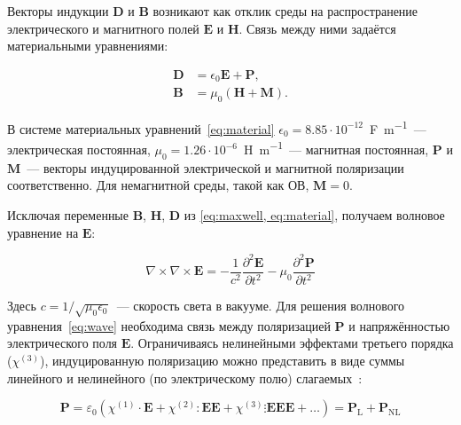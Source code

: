 Векторы индукции $\mathbf{D}$ и $\mathbf{B}$ возникают как отклик среды на распространение электрического и магнитного полей  $\mathbf{E}$ и  $\mathbf{H}$. Связь между ними задаётся материальными уравнениями:

\begin{subequations}\label{eq:material}
	\begin{align}
		\mathbf{D} &= \epsilon_0 \mathbf{E} + \mathbf{P}, \\
		\mathbf{B} &= \mu_0 (\mathbf{H} + \mathbf{M}).
	\end{align}
\end{subequations}

В системе материальных уравнений~\cref{eq:material} $\epsilon_0=8.85\cdot10^{-12}$~\si{\farad\per\meter}~--- электрическая постоянная, $\mu_0=1.26 \cdot 10^{-6}$~\si{\henry\per\meter}~--- магнитная постоянная, $\mathbf{P}$ и $\mathbf{M}$~--- векторы индуцированной электрической и магнитной поляризации соответственно. Для немагнитной среды, такой как ОВ, $\mathbf{M} = 0$.

Исключая переменные $\mathbf{B}$, $\mathbf{H}$, $\mathbf{D}$ из \cref{eq:maxwell, eq:material}, получаем волновое уравнение на $\mathbf{E}$:

\begin{equation}
	\nabla \times \nabla \times \mathbf{E} = -\frac{1}{c^2} \frac{\partial^2 \mathbf{E}}{\partial t^2} - \mu_0 \frac{\partial^2 \mathbf{P}}{\partial t^2} \label{eq:wave}
\end{equation}

Здесь $c = 1/\sqrt{\mu_0\epsilon_0}$~--- скорость света в вакууме. Для решения волнового уравнения~\cref{eq:wave} необходима связь между поляризацией $\mathbf{P}$ и напряжённостью электрического поля $\mathbf{E}$. Ограничиваясь нелинейными эффектами третьего порядка ($\chi^{(3)}$), индуцированную поляризацию можно представить в виде суммы линейного и нелинейного (по электрическому полю) слагаемых~\cite{boyd2008nonlinear}:

\begin{equation}
	\mathbf{P} = \varepsilon_0 \left( \chi^{(1)} \cdot \mathbf{E} + \chi^{(2)} : \mathbf{EE} + \chi^{(3)} \vdots \mathbf{EEE} + \ldots \right) = \mathbf{P_{\mathrm{L}}} + \mathbf{P_{\mathrm{NL}}}
	\label{eq:polarization}
\end{equation}


